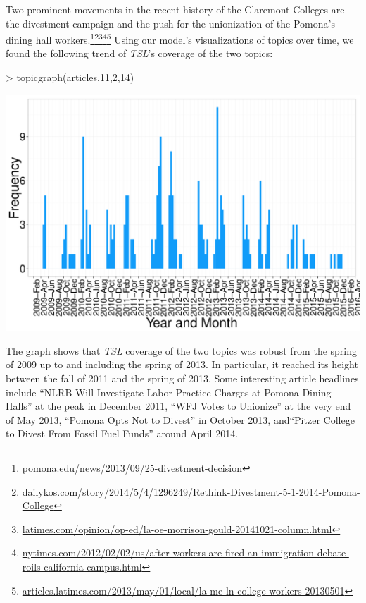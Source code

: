 \documentclass[a4paper]{article}
\begin{document}
Two prominent movements in the recent history of the Claremont Colleges are the divestment campaign and the push for the unionization of the Pomona's dining hall workers.\footnote{\href{http://www.pomona.edu/news/2013/09/25-divestment-decision}{pomona.edu/news/2013/09/25-divestment-decision}}\footnote{\href{http://www.dailykos.com/story/2014/5/4/1296249/Rethink-Divestment-5-1-2014-Pomona-College}{dailykos.com/story/2014/5/4/1296249/Rethink-Divestment-5-1-2014-Pomona-College}}\footnote{\href{http://www.latimes.com/opinion/op-ed/la-oe-morrison-gould-20141021-column.html}{latimes.com/opinion/op-ed/la-oe-morrison-gould-20141021-column.html}}\footnote{\href{http://www.nytimes.com/2012/02/02/us/after-workers-are-fired-an-immigration-debate-roils-california-campus.html?_r=0}{nytimes.com/2012/02/02/us/after-workers-are-fired-an-immigration-debate-roils-california-campus.html}}\footnote{\href{http://articles.latimes.com/2013/may/01/local/la-me-ln-college-workers-20130501}{articles.latimes.com/2013/may/01/local/la-me-ln-college-workers-20130501}} Using our model's visualizations of topics over time, we found the following trend of \textit{TSL}'s coverage of the two topics:

\begin{Schunk}
\begin{Sinput}
> topicgraph(articles,11,2,14)
\end{Sinput}
\end{Schunk}
\includegraphics{FinalProject-007}

The graph shows that \textit{TSL} coverage of the two topics was robust from the spring of 2009 up to and including the spring of 2013. In particular, it reached its height between the fall of 2011 and the spring of 2013. Some interesting article headlines include ``NLRB Will Investigate Labor Practice Charges at Pomona Dining Halls'' at the peak in December 2011, ``WFJ Votes to Unionize'' at the very end of May 2013, ``Pomona Opts Not to Divest'' in October 2013, and``Pitzer College to Divest From Fossil Fuel Funds'' around April 2014.
\end{document}
